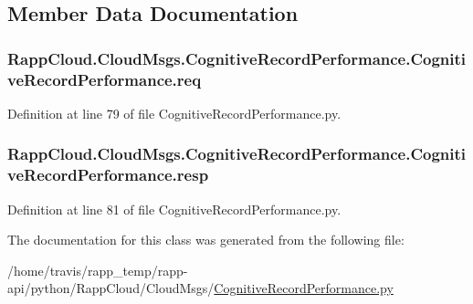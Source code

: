 \subsection{Member Data Documentation}
\hypertarget{classRappCloud_1_1CloudMsgs_1_1CognitiveRecordPerformance_1_1CognitiveRecordPerformance_a4b3920d8b030af458e45538bfb626c6f}{
\subsubsection[{req}]{\setlength{\rightskip}{0pt plus 5cm}Rapp\-Cloud.\-Cloud\-Msgs.\-Cognitive\-Record\-Performance.\-Cognitive\-Record\-Performance.\-req}}\label{classRappCloud_1_1CloudMsgs_1_1CognitiveRecordPerformance_1_1CognitiveRecordPerformance_a4b3920d8b030af458e45538bfb626c6f}


Definition at line 79 of file Cognitive\-Record\-Performance.\-py.

\hypertarget{classRappCloud_1_1CloudMsgs_1_1CognitiveRecordPerformance_1_1CognitiveRecordPerformance_a8aa9c2a274a3479225761ef354c04777}{
\subsubsection[{resp}]{\setlength{\rightskip}{0pt plus 5cm}Rapp\-Cloud.\-Cloud\-Msgs.\-Cognitive\-Record\-Performance.\-Cognitive\-Record\-Performance.\-resp}}\label{classRappCloud_1_1CloudMsgs_1_1CognitiveRecordPerformance_1_1CognitiveRecordPerformance_a8aa9c2a274a3479225761ef354c04777}


Definition at line 81 of file Cognitive\-Record\-Performance.\-py.



The documentation for this class was generated from the following file\-:\begin{DoxyCompactItemize}
\item 
/home/travis/rapp\-\_\-temp/rapp-\/api/python/\-Rapp\-Cloud/\-Cloud\-Msgs/\hyperlink{CognitiveRecordPerformance_8py}{Cognitive\-Record\-Performance.\-py}\end{DoxyCompactItemize}
